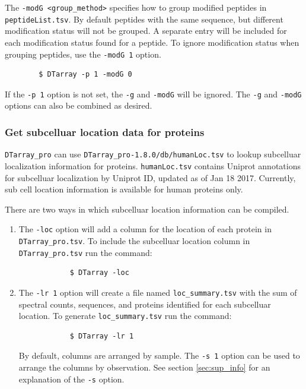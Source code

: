 \documentclass[12pt]{article}
\newcommand{\VERSION}{1.8.0}
\begin{document}
	\noindent
	The \texttt{-modG <group\_method>} specifies how to group modified peptides in \texttt{peptideList.tsv}.  By default peptides  with  the  same sequence, but different modification status will not be grouped. A separate entry will be  included for each modification status found for a peptide. To ignore modification status when grouping peptides, use the \texttt{-modG 1} option.
	
	\begin{lstlisting}
		$ DTarray -p 1 -modG 0
	\end{lstlisting}
	
	\noindent
	If the \texttt{-p 1} option is not set, the \texttt{-g} and \texttt{-modG} will be ignored. The \texttt{-g} and \texttt{-modG} options can also be combined as desired.  
	
	\subsubsection{Get subcelluar location data for proteins} \label{sec:loc}
	
	\texttt{DTarray\_pro} can use \texttt{DTarray\_pro-\VERSION/db/humanLoc.tsv}  to lookup subcelluar localization information for proteins.  \texttt{humanLoc.tsv} contains Uniprot annotations for subcelluar localization by Uniprot ID,	updated as of Jan 18 2017. Currently, sub cell location information
	is available for human proteins only.
	
	\bigskip
	\noindent
	There are two ways in which subcelluar location information can be compiled.
	
	\begin{enumerate}
		\item The \texttt{-loc} option will add a column for the location of each protein in \texttt{DTarray\_pro.tsv}.  To include the subcelluar location column in \texttt{DTarray\_pro.tsv} run the command:
		
		\begin{lstlisting}
			$ DTarray -loc
		\end{lstlisting}

		\item The \texttt{-lr 1} option will create a file named \texttt{loc\_summary.tsv} with the sum of spectral counts, sequences, and proteins identified for each subcelluar location.  To generate \texttt{loc\_summary.tsv} run the command:
		
		\begin{lstlisting}
			$ DTarray -lr 1
		\end{lstlisting}
		
		\noindent
		By default, columns are arranged by sample.  The \texttt{-s 1} option can be used to arrange the columns by observation.  See section \ref{sec:sup_info} for an explanation of the \texttt{-s} option.  
	
	\end{enumerate}
	
\end{document}
